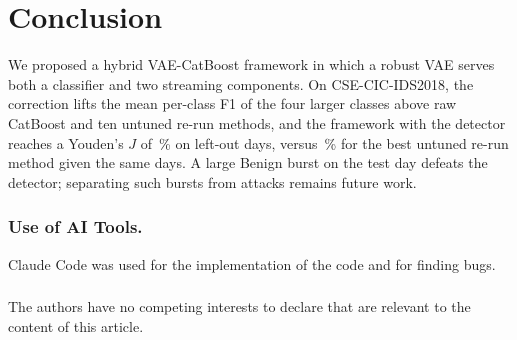 \documentclass[runningheads,a4paper]{llncs}
\begin{document}
\section{Conclusion}\label{sec:conclusion}

We proposed a hybrid VAE-CatBoost framework in which a robust VAE serves both a classifier and two streaming components. On CSE-CIC-IDS2018, the correction lifts the mean per-class F1 of the four larger classes above raw CatBoost and ten untuned re-run methods, and the framework with the detector reaches a Youden's $J$ of \JOursDaysEqual\,\% on left-out days, versus \JEqualBestDays\,\% for the best untuned re-run method given the same days. A large Benign burst on the test day defeats the detector; separating such bursts from attacks remains future work.

\begin{credits}
\subsubsection{Use of AI Tools.}
Claude Code was used for the implementation of the code and for finding bugs.

\subsubsection{\discintname}
The authors have no competing interests to declare that are relevant to the content of this article.
\end{credits}



\end{document}

